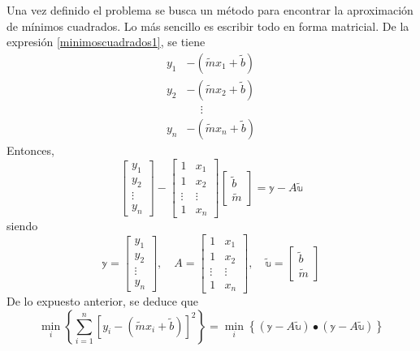 Una vez definido el problema se busca un método para encontrar la aproximación de mínimos cuadrados. Lo más sencillo es escribir todo en forma matricial. De la expresión \eqref{minimoscuadrados1}, se tiene
\begin{align*}
    y_1 & - \left(\tilde{m}x_1 + \tilde{b} \right) \\
    y_2 & - \left(\tilde{m}x_2 + \tilde{b} \right) \\
    & \phantom{-} \vdots \\
    y_n & - \left(\tilde{m}x_n + \tilde{b} \right)
\end{align*}
Entonces,
$$\begin{bmatrix}
    y_1 \\
    y_2 \\
    \vdots \\
    y_n
\end{bmatrix} - \begin{bmatrix}
    1 & x_1 \\
    1 & x_2 \\
    \vdots & \vdots \\
    1 & x_n
\end{bmatrix} \begin{bmatrix}
    \tilde{b} \\
    \tilde{m}
\end{bmatrix} = \mathbb{y} - A \tilde{\mathbb{u}}$$
siendo
$$\mathbb{y} = \begin{bmatrix}
    y_1 \\
    y_2 \\
    \vdots \\
    y_n
\end{bmatrix}, \quad A = \begin{bmatrix}
    1 & x_1 \\
    1 & x_2 \\
    \vdots & \vdots \\
    1 & x_n
\end{bmatrix}, \quad \tilde{\mathbb{u}} = \begin{bmatrix}
    \tilde{b} \\
    \tilde{m}
\end{bmatrix}$$
De lo expuesto anterior, se deduce que
\begin{equation}
    \min_{i} \left\{ \sum_{i=1}^{n} \left[ y_i - \left(\tilde{m}x_i + \tilde{b} \right) \right]^2 \right\} = \min_{i} \left\{ (\mathbb{y} - A \tilde{\mathbb{u}}) \bullet (\mathbb{y} - A \tilde{\mathbb{u}}) \right\} \label{minimoscuadrados2}
\end{equation}
